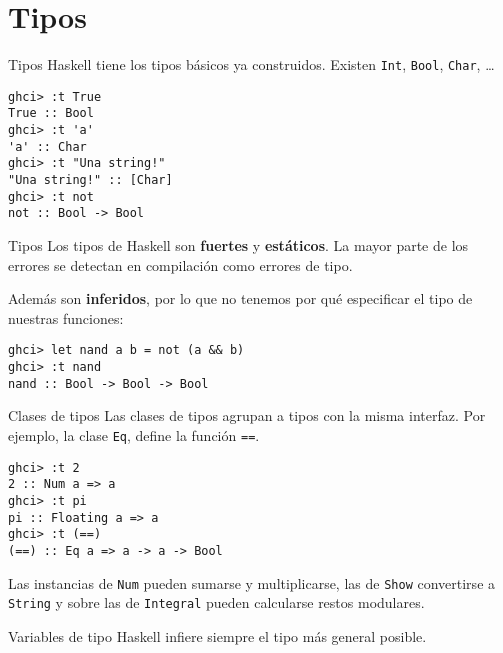 \section{Tipos}

\begin{frame}[fragile]{Tipos}
  Haskell tiene los tipos básicos ya construidos. Existen
  \texttt{Int}, \texttt{Bool}, \texttt{Char}, \dots
  \begin{lstlisting}
ghci> :t True
True :: Bool
ghci> :t 'a'
'a' :: Char
ghci> :t "Una string!"
"Una string!" :: [Char]
ghci> :t not
not :: Bool -> Bool
  \end{lstlisting}
\end{frame}

\begin{frame}[fragile]{Tipos}
  Los tipos de Haskell son \textbf{fuertes} y \textbf{estáticos}.
  La mayor parte de los errores se detectan en compilación como errores de tipo.

  \espacio

  Además son \textbf{inferidos}, por lo que no tenemos por qué especificar el
  tipo de nuestras funciones:

  \espacio

  \begin{lstlisting}
ghci> let nand a b = not (a && b)
ghci> :t nand
nand :: Bool -> Bool -> Bool
  \end{lstlisting}
\end{frame}

\begin{frame}[fragile]{Clases de tipos}
Las clases de tipos agrupan a tipos con la misma interfaz.
Por ejemplo, la clase \texttt{Eq}, define la función \texttt{==}.

\espacio

\begin{lstlisting}
ghci> :t 2
2 :: Num a => a
ghci> :t pi
pi :: Floating a => a
ghci> :t (==)
(==) :: Eq a => a -> a -> Bool
\end{lstlisting}

\espacio

Las instancias de \texttt{Num} pueden sumarse y multiplicarse,
las de \texttt{Show} convertirse a \texttt{String}
y sobre las de \texttt{Integral} pueden calcularse restos modulares.
\end{frame}

\begin{frame}[fragile]{Variables de tipo}
  Haskell infiere siempre el tipo más general posible.
\end{frame}



